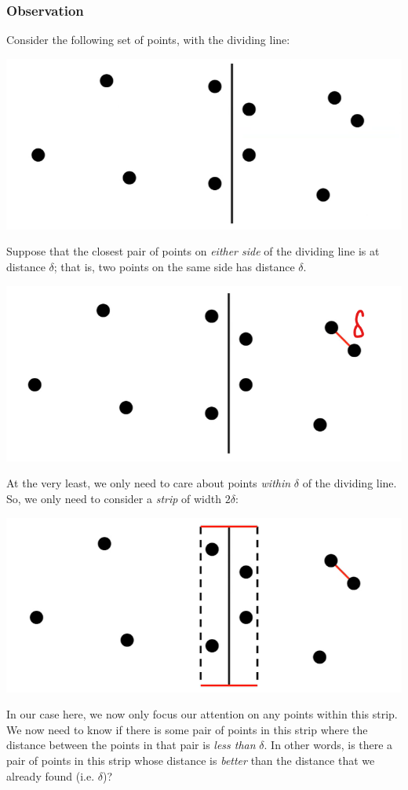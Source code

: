 \documentclass[letterpaper]{article}
\begin{document}
\subsubsection{Observation}
Consider the following set of points, with the dividing line: 
\begin{center}
    \includegraphics[scale=0.3]{../assets/closest_pts_3.png}
\end{center}
Suppose that the closest pair of points on \emph{either side} of the dividing line is at distance $\delta$; that is, two points on the same side has distance $\delta$. 
\begin{center}
    \includegraphics[scale=0.3]{../assets/closest_pts_4.png}
\end{center}
At the very least, we only need to care about points \emph{within} $\delta$ of the dividing line. So, we only need to consider a \emph{strip} of width $2\delta$:
\begin{center}
    \includegraphics[scale=0.3]{../assets/closest_pts_5.png}
\end{center}
In our case here, we now only focus our attention on any points within this strip. We now need to know if there is some pair of points in this strip where the distance between the points in that pair is \emph{less than} $\delta$. In other words, is there a pair of points in this strip whose distance is \emph{better} than the distance that we already found (i.e. $\delta$)?
\end{document}
